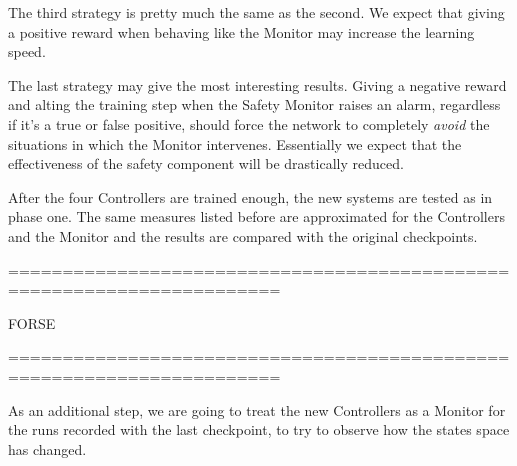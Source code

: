 The third strategy is pretty much the same as the second. We expect that giving a positive reward when behaving like the Monitor may increase the learning speed.

The last strategy may give the most interesting results. Giving a negative reward and alting the training step when the Safety Monitor raises an alarm, regardless if it's a true or false positive, should force the network to completely \textsl{avoid} the situations in which the Monitor intervenes. Essentially we expect that the effectiveness of the safety component will be drastically reduced.\newline

After the four Controllers are trained enough, the new systems are tested as in phase one. The same measures listed before are approximated for the Controllers and the Monitor and the results are compared with the original checkpoints.


=======================================================================

FORSE

=======================================================================

As an additional step, we are going to treat the new Controllers as a Monitor for the runs recorded with the last checkpoint, to try to observe how the states space has changed.

